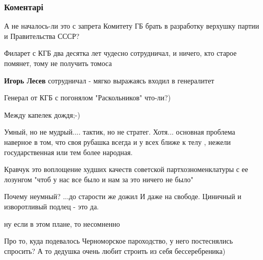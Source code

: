  
 
 
 
 
\subsubsection{Коментарі}
\label{sec:28_07_2018.fb.lesev_igor.1.kravchuk_interview_strana.cmt}

\begin{itemize} %
А не началось-ли это с запрета Комитету ГБ брать в разработку верхушку партии и Правительства СССР?

\begin{itemize} %
Филарет с КГБ два десятка лет чудесно сотрудничал, и ничего, кто старое помянет, тому не получить томоса

\textbf{Игорь Лесев} сотрудничал - мягко выражаясь входил в генералитет

Генерал от КГБ с погонялом "Раскольников" что-ли?)
\end{itemize} %

Между капелек дождя;-)


Умный, но не мудрый.... тактик, но не стратег. Хотя... основная проблема наверное
в том, что своя рубашка всегда и у всех ближе к телу , нежели государственная
или тем более народная.


Кравчук это воплощение худших качеств советской партхозноменклатуры с ее лозунгом "чтоб у нас все было и нам за это ничего не было"

Почему неумный?
...до старости же дожил
И даже на свободе.
Циничный и изворотливый подлец - это да.

\begin{itemize} %
ну если в этом плане, то несомненно
\end{itemize} %

Про то, куда подевалось Черноморское пароходство, у него постеснялись спросить? А то дедушка очень любит строить из себя бессеребреника)


\end{itemize}
